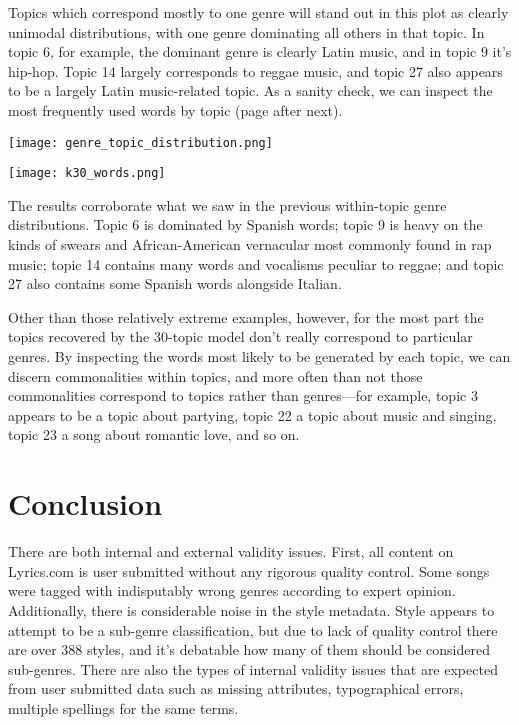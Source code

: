\documentclass[12pt, titlepage]{article}
\begin{document}
Topics which correspond mostly to one genre will stand out in this plot as clearly unimodal distributions, with one genre dominating all others in that topic. In topic 6, for example, the dominant genre is clearly Latin music, and in topic 9 it's hip-hop. Topic 14 largely corresponds to reggae music, and topic 27 also appears to be a largely Latin music-related topic. As a sanity check, we can inspect the most frequently used words by topic (page after next).

\begin{center}
    \texttt{[image: genre\_topic\_distribution.png]}
\end{center}

\begin{center}
    \texttt{[image: k30\_words.png]}
\end{center}

The results corroborate what we saw in the previous within-topic genre distributions. Topic 6 is dominated by Spanish words; topic 9 is heavy on the kinds of swears and African-American vernacular most commonly found in rap music; topic 14 contains many words and vocalisms peculiar to reggae; and topic 27 also contains some Spanish words alongside Italian.

Other than those relatively extreme examples, however, for the most part the topics recovered by the 30-topic model don't really correspond to particular genres. By inspecting the words most likely to be generated by each topic, we can discern commonalities within topics, and more often than not those commonalities correspond to topics rather than genres---for example, topic 3 appears to be a topic about partying, topic 22 a topic about music and singing, topic 23 a song about romantic love, and so on. 

\section{Conclusion}
There are both internal and external validity issues. First, all content on Lyrics.com is user submitted without any rigorous quality control. Some songs were tagged with indisputably wrong genres according to expert opinion. Additionally, there is considerable noise in the style metadata. Style appears to attempt to be a sub-genre classification, but due to lack of quality control there are over 388 styles, and it's debatable how many of them should be considered sub-genres. There are also the types of internal validity issues that are expected from user submitted data such as missing attributes, typographical errors, multiple spellings for the same terms.
\end{document}
